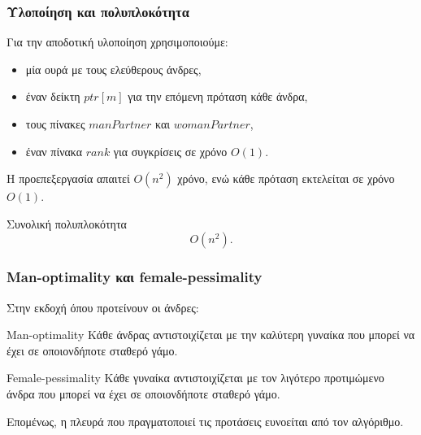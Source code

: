 \documentclass{beamer}
\begin{document}
	\begin{frame}
		\frametitle{Υλοποίηση και πολυπλοκότητα}
		
		Για την αποδοτική υλοποίηση χρησιμοποιούμε:
		
		\begin{itemize}
			\item μία ουρά με τους ελεύθερους άνδρες,
			\item έναν δείκτη $\mathit{ptr}[m]$ για την επόμενη πρόταση κάθε άνδρα,
			\item τους πίνακες $\mathit{manPartner}$ και $\mathit{womanPartner}$,
			\item έναν πίνακα $\mathit{rank}$ για συγκρίσεις σε χρόνο $O(1)$.
		\end{itemize}
		
		Η προεπεξεργασία απαιτεί $O(n^2)$ χρόνο, ενώ κάθε πρόταση εκτελείται σε χρόνο $O(1)$.
		
		\begin{block}{Συνολική πολυπλοκότητα}
			\[
			O(n^2).
			\]
		\end{block}
	\end{frame}
	
	\begin{frame}
		\frametitle{Man-optimality και female-pessimality}
		
		Στην εκδοχή όπου προτείνουν οι άνδρες:
		
		\begin{block}{Man-optimality}
			Κάθε άνδρας αντιστοιχίζεται με την καλύτερη γυναίκα που μπορεί να έχει σε οποιονδήποτε σταθερό γάμο.
		\end{block}
		
		\begin{block}{Female-pessimality}
			Κάθε γυναίκα αντιστοιχίζεται με τον λιγότερο προτιμώμενο άνδρα που μπορεί να έχει σε οποιονδήποτε σταθερό γάμο.
		\end{block}
		
		Επομένως, η πλευρά που πραγματοποιεί τις προτάσεις ευνοείται από τον αλγόριθμο.
	\end{frame}
	
	
\end{document}

